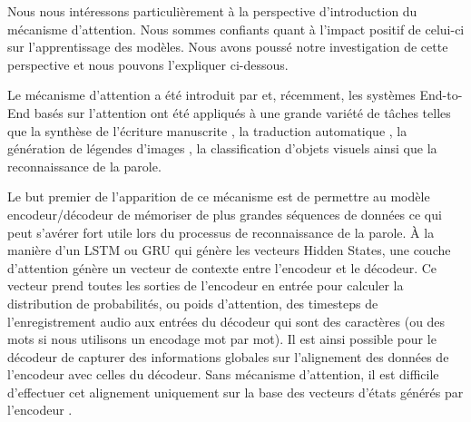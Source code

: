 Nous nous intéressons particulièrement à la perspective d'introduction du mécanisme d'attention. Nous sommes confiants quant à l'impact positif de celui-ci sur l'apprentissage des modèles. Nous avons poussé notre investigation de cette perspective et nous pouvons l'expliquer ci-dessous. 

Le mécanisme d'attention a été introduit par \cite{attention} et, récemment, les systèmes End-to-End basés sur l'attention ont été appliqués à une grande variété de tâches telles que la synthèse de l'écriture manuscrite \cite{Attention_handwriting}, la traduction automatique \cite{attention}, la génération de légendes d'images \cite{imgattention}, la classification d'objets visuels \cite{visualattentionrnn} ainsi que la reconnaissance de la parole.

Le but premier de l'apparition de ce mécanisme est de permettre au modèle encodeur/décodeur de mémoriser de plus grandes séquences de données ce qui peut s'avérer fort utile lors du processus de reconnaissance de la parole. À la manière d'un LSTM ou GRU qui génère les vecteurs Hidden States, une couche d'attention génère un vecteur de contexte entre l'encodeur et le décodeur. Ce vecteur prend toutes les sorties de l'encodeur en entrée pour calculer la distribution de probabilités, ou poids d'attention, des timesteps de l'enregistrement audio aux entrées du décodeur qui sont des caractères (ou des mots si nous utilisons un encodage mot par mot). Il est ainsi possible pour le décodeur de capturer des informations globales sur l'alignement des données de l'encodeur avec celles du décodeur. Sans mécanisme d'attention, il est difficile d'effectuer cet alignement uniquement sur la base des vecteurs d'états générés par l'encodeur \cite{attentionfunction}. 

    
